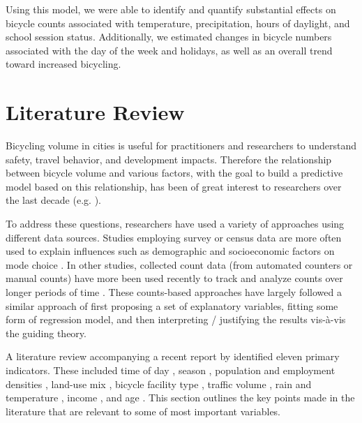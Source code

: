 \documentclass[12pt,letterpaper,article]{memoir}
\begin{document}
Using this model, we were able to identify and quantify substantial
effects on bicycle counts associated with temperature, precipitation,
hours of daylight, and school session status. Additionally, we
estimated changes in bicycle numbers associated with the day of the
week and holidays, as well as an overall trend toward increased
bicycling.

\chapter*{Literature Review}
% 
% 

Bicycling volume in cities is useful for practitioners and researchers
to understand safety, travel behavior, and development impacts.
Therefore the relationship between bicycle volume and various factors,
with the goal to build a predictive model based on this relationship,
has been of great interest to researchers over the last decade (e.g.
\cite{Griswold:2011aa,Fields:2012aa,Niemeier:1996aa,Nosal:2014aa}).

To address these questions, researchers have used a variety of
approaches using different data sources. Studies employing survey or
census data are more often used to explain influences such as
demographic and socioeconomic factors on mode choice
\parencite{Parkin:2008aa,Helbich:2014aa}. In other studies, collected
count data (from automated counters or manual counts) have more been
used recently to track and analyze counts over longer periods of
time \parencite{Griswold:2011aa,Nosal:2014aa}. These counts-based
approaches have largely followed a similar approach of first proposing
a set of explanatory variables, fitting some form of regression model,
and then interpreting / justifying the results vis-\`{a}-vis the
guiding theory.

A literature review accompanying a recent report by
\textcite{Bassok:2011aa} identified eleven primary indicators. These included 
time of day \parencite{Schwartz:1999aa}, season \parencite{Niemeier:1996aa},
population and employment densities
\parencite{McCahil:2008aa,Pinjari:2009aa}, land-use mix
\parencite{Pinjari:2009aa}, bicycle facility type \parencite{Hunt:2007aa},
traffic volume \parencite{McDonald:2007aa}, rain and temperature
\parencite{Niemeier:1996aa,Parkin:2008aa},
income \parencite{Turner:1998aa}, and age \parencite{Hunt:2007aa}.
This section outlines the key points made in the literature that are
relevant to some of most important variables.
\end{document}
